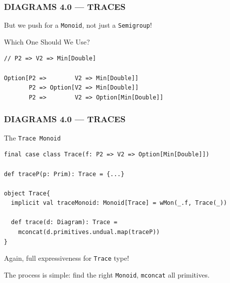 \documentclass{beamer}
\begin{document}
\begin{frame}[fragile] \frametitle{DIAGRAMS 4.0 --- TRACES}
  But we push for a \texttt{Monoid}, not just a \texttt{Semigroup}!

  \begin{block}{Which One Should We Use?}
  \begin{lstlisting}
// P2 => V2 => Min[Double]

Option[P2 =>        V2 => Min[Double]]
       P2 => Option[V2 => Min[Double]]
       P2 =>        V2 => Option[Min[Double]]
  \end{lstlisting}
  \end{block}
\end{frame}

\begin{frame}[fragile] \frametitle{DIAGRAMS 4.0 --- TRACES}
  \begin{block}{The \texttt{Trace Monoid}}
  \begin{lstlisting}
final case class Trace(f: P2 => V2 => Option[Min[Double]])

def traceP(p: Prim): Trace = {...}

object Trace{
  implicit val traceMonoid: Monoid[Trace] = wMon(_.f, Trace(_))

  def trace(d: Diagram): Trace =
    mconcat(d.primitives.undual.map(traceP))
}
  \end{lstlisting}
  \end{block}

Again, full expressiveness for \texttt{Trace} type!

The process is simple: find the right \texttt{Monoid}, \texttt{mconcat} all primitives.
\end{frame}
\end{document}
